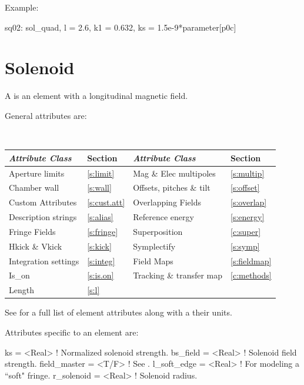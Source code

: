 {Example:
\begin{example}
  sq02: sol_quad, l = 2.6, k1 = 0.632, ks = 1.5e-9*parameter[p0c]
\end{example}

\newpage

\section{Solenoid}
\label{s:sol}

A  is an element with a longitudinal magnetic field.

General  attributes are:
\begin{center}
\tt
\begin{tabular}{llll} \toprule
  {\sl Attribute Class}      & Section           & {\sl Attribute Class}      & Section            \\ \midrule
  Aperture limits            & \ref{s:limit}     & Mag \& Elec multipoles     & \ref{s:multip}     \\
  Chamber wall               & \ref{s:wall}      & Offsets, pitches \& tilt   & \ref{s:offset}     \\
  Custom Attributes          & \ref{s:cust.att}  & Overlapping Fields         & \ref{s:overlap}    \\
  Description strings        & \ref{s:alias}     & Reference energy           & \ref{s:energy}     \\ 
  Fringe Fields              & \ref{s:fringe}    & Superposition              & \ref{c:super}      \\
  Hkick \& Vkick             & \ref{s:kick}      & Symplectify                & \ref{s:symp}       \\
  Integration settings       & \ref{s:integ}     & Field Maps                 & \ref{s:fieldmap}   \\
  Is_on                      & \ref{s:is.on}     & Tracking \& transfer map   & \ref{c:methods}    \\ 
  Length                     & \ref{s:l}         &                            &                    \\ 
  \bottomrule
\end{tabular}
\end{center}
\toffset
See  for a full list of element attributes along with a their units.

Attributes specific to an  element are:
\begin{example}
  ks           = <Real>  ! Normalized solenoid strength.
  bs_field     = <Real>  ! Solenoid field strength.
  field_master = <T/F>   ! See .
  l_soft_edge  = <Real>  ! For modeling a ``soft" fringe.
  r_solenoid   = <Real>  ! Solenoid radius.
\end{example}

}
